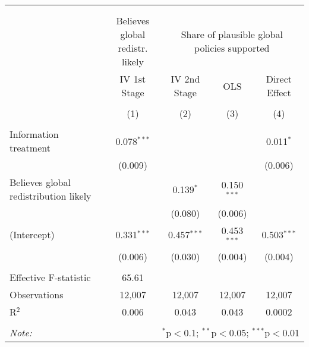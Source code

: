 
\begin{tabular}{@{\extracolsep{5pt}}lcccc} 
\\[-1.8ex]\hline 
\hline \\[-1.8ex] 
\\[-1.8ex] & \makecell{Believes global\\redistr. likely} & \multicolumn{3}{c}{Share of plausible global policies supported} \\ 
 & IV 1st Stage & IV 2nd Stage & OLS & Direct Effect \\ 
\\[-1.8ex] & (1) & (2) & (3) & (4)\\ 
\hline \\[-1.8ex] 
 Information treatment & 0.078$^{***}$ &  &  & 0.011$^{*}$ \\ 
  & (0.009) &  &  & (0.006) \\ 
  Believes global redistribution likely &  & 0.139$^{*}$ & 0.150$^{***}$ &  \\ 
  &  & (0.080) & (0.006) &  \\ 
  (Intercept) & 0.331$^{***}$ & 0.457$^{***}$ & 0.453$^{***}$ & 0.503$^{***}$ \\ 
  & (0.006) & (0.030) & (0.004) & (0.004) \\ 
 \hline \\[-1.8ex] 
Effective F-statistic & 65.61 &  &  &  \\ 
Observations & 12,007 & 12,007 & 12,007 & 12,007 \\ 
R$^{2}$ & 0.006 & 0.043 & 0.043 & 0.0002 \\ 
\hline 
\hline \\[-1.8ex] 
\textit{Note:}  & \multicolumn{4}{r}{$^{*}$p$<$0.1; $^{**}$p$<$0.05; $^{***}$p$<$0.01} \\ 
\end{tabular} 
